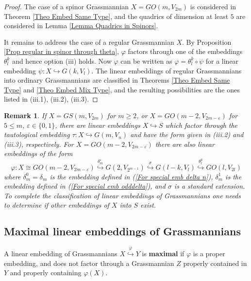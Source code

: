 \documentclass[12pt]{amsart}
\def\hw  {\hookrightarrow}
\newtheorem{rem}{Remark}[section]
\begin{document}
\begin{proof}
The case of a spinor Grassmannian $X=GO(m,V_{2m})$ is considered in Theorem \ref{Theo Embed Same Type}, and the quadrics of dimension at least $5$ are considered in Lemma \ref{Lemma Quadrics in Spinors}.

It remains to address the case of a regular Grassmannian $X$. By Proposition \ref{Prop regular in spinor through theta}, $\varphi$ factors through one of the embeddings $\theta_{l}^k$ and hence option (iii) holds. Now $\varphi$ can be written as $\varphi=\theta_l^k\circ \psi$ for a linear embedding $\psi:X\hw G(k,V_l)$. The linear embeddings of regular Grassmannians into ordinary Grassmannians are classified in Theorems \ref{Theo Embed Same Type} and \ref{Theo Embed Mix Type}, and the resulting possibilities are the ones listed in (iii.1), (iii.2), (iii.3).
\end{proof}


\begin{rem} If $X=GS(m,V_{2m})$ for $m\geq 2$, or $X=GO(m-2,V_{2m-\varepsilon})$ for $5\leq m$, $\varepsilon\in\{0,1\}$, there are linear embeddings $X\hw S$ which factor through the tautological embedding $\tau:X\hw G(m,V_n)$ and have the form given in (iii.2) and (iii.3), respectively. For $X=GO(m-2,V_{2m-\varepsilon})$ there are also linear embeddings of the form
$$
\varphi: X\cong GO(m-2,V_{2m-\varepsilon}) \stackrel{\delta_m^\varepsilon}{\hw} G(2,V_{2^{m-1}}) \stackrel{\sigma}{\hw} G(l-k,V_l) \stackrel{\theta_l^k}{\hw} GO(l,V_{2l})
$$
where $\delta_m^0=\delta_m$ is the embedding defined in (\ref{For special emb delta n}), $\delta_m^1$ is the embedding defined in (\ref{For special emb odddelta}), and $\sigma$ is a standard extension. To complete the classification of linear embeddings of Grassmannians one needs to determine if other embeddings of $X$ into $S$ exist.
\end{rem}



\subsection{Maximal linear embeddings of Grassmannians}\label{Sec Maximal Embeddings}

A linear embedding of Grassmannians $X\stackrel{\varphi}{\hookrightarrow} Y$ is {\bf maximal} if $\varphi$ is a proper embedding, and does not factor through a Grassmannian $Z$ properly contained in $Y$ and properly containing $\varphi(X)$.
\end{document}

